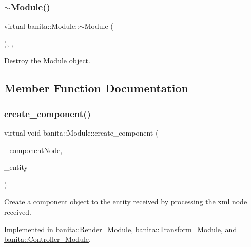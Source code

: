 \subsubsection{\texorpdfstring{$\sim$Module()}{~Module()}}
{\footnotesize\ttfamily virtual banita\+::\+Module\+::$\sim$\+Module (\begin{DoxyParamCaption}{ }\end{DoxyParamCaption})\hspace{0.3cm}{\ttfamily [inline]}, {\ttfamily [protected]}, {\ttfamily [virtual]}}



Destroy the \mbox{\hyperlink{classbanita_1_1_module}{Module}} object. 



\subsection{Member Function Documentation}
\mbox{\label{classbanita_1_1_module_ace6d7ce15d60044f233d30a43dc961dd}} 
\subsubsection{\texorpdfstring{create\_component()}{create\_component()}}
{\footnotesize\ttfamily virtual void banita\+::\+Module\+::create\+\_\+component (\begin{DoxyParamCaption}\item[{X\+M\+L\+\_\+\+Node $\ast$}]{\+\_\+component\+Node,  }\item[{\mbox{\hyperlink{classbanita_1_1_entity}{Entity}} $\ast$}]{\+\_\+entity }\end{DoxyParamCaption})\hspace{0.3cm}{\ttfamily [pure virtual]}}



Create a component object to the entity received by processing the xml node received. 



Implemented in \mbox{\hyperlink{classbanita_1_1_render___module_a639688937a247c3fcc21e720ec0982b7}{banita\+::\+Render\+\_\+\+Module}}, \mbox{\hyperlink{classbanita_1_1_transform___module_a2a1181f23617bb6dfe71e1f7e16945e9}{banita\+::\+Transform\+\_\+\+Module}}, and \mbox{\hyperlink{classbanita_1_1_controller___module_a5176cb9d457c9bd69d6db37b18a79f13}{banita\+::\+Controller\+\_\+\+Module}}.

